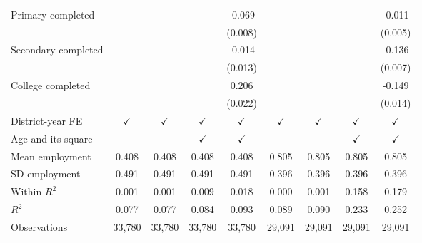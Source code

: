 \begin{center}
\begin{adjustbox}{max width=1\textwidth}
\begin{threeparttable}[!h]
\begin{tabular}{lcccccccc}
Primary completed   &                     &                     &                     &      -0.069\sym{***}&                     &                     &                     &      -0.011\sym{*}  \\
                    &                     &                     &                     &     (0.008)         &                     &                     &                     &     (0.005)         \\
Secondary completed &                     &                     &                     &      -0.014         &                     &                     &                     &      -0.136\sym{***}\\
                    &                     &                     &                     &     (0.013)         &                     &                     &                     &     (0.007)         \\
College completed   &                     &                     &                     &       0.206\sym{***}&                     &                     &                     &      -0.149\sym{***}\\
                    &                     &                     &                     &     (0.022)         &                     &                     &                     &     (0.014)         \\
\midrule District-year FE&$ \checkmark $&$ \checkmark $&$ \checkmark $&$ \checkmark $&$ \checkmark $&$ \checkmark $&$ \checkmark $&$ \checkmark $\\
Age and its square  &            &            &$ \checkmark $&$ \checkmark $&            &            &$ \checkmark $&$ \checkmark $\\
\midrule Mean employment&       0.408&       0.408&       0.408&       0.408&       0.805&       0.805&       0.805&       0.805\\
SD employment       &       0.491&       0.491&       0.491&       0.491&       0.396&       0.396&       0.396&       0.396\\
Within $ R^2 $      &       0.001&       0.001&       0.009&       0.018&       0.000&       0.001&       0.158&       0.179\\
$ R^2 $             &       0.077&       0.077&       0.084&       0.093&       0.089&       0.090&       0.233&       0.252\\
\midrule Observations&      33,780&      33,780&      33,780&      33,780&      29,091&      29,091&      29,091&      29,091\\

\end{tabular}
\end{threeparttable}
\end{adjustbox}
\end{center}
